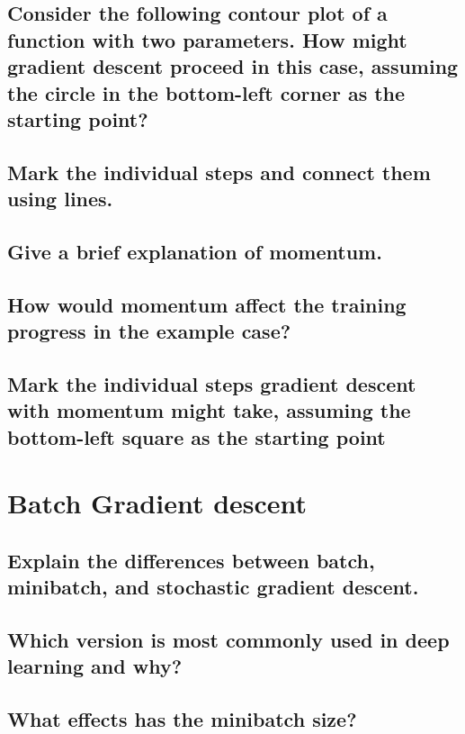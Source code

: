 \subsection{Consider the following contour plot of a function with two parameters. How might gradient descent proceed in this case, assuming the circle in the bottom-left corner as the starting point?}

\subsection{Mark the individual steps and connect them using lines.}

\subsection{Give a brief explanation of momentum.}

\subsection{How would momentum affect the training progress in the example case?}

\subsection{Mark the individual steps gradient descent with momentum might take, assuming the bottom-left square as the starting point}

\section{Batch Gradient descent}

\subsection{Explain the differences between batch, minibatch, and stochastic gradient descent.}

\subsection{Which version is most commonly used in deep learning and why?}

\subsection{What effects has the minibatch size?}


